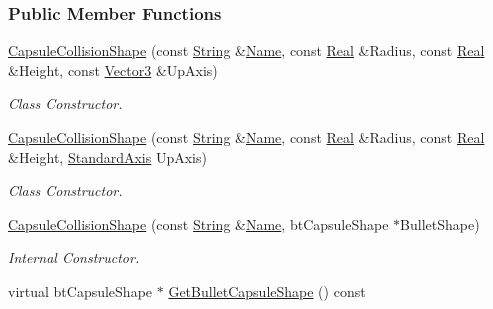 \subsubsection*{Public Member Functions}
\begin{DoxyCompactItemize}
\item 
\hyperlink{classMezzanine_1_1CapsuleCollisionShape_a8709e48065ef7698506c9854d41afe8e}{CapsuleCollisionShape} (const \hyperlink{namespaceMezzanine_acf9fcc130e6ebf08e3d8491aebcf1c86}{String} \&\hyperlink{classMezzanine_1_1CollisionShape_aac524c5c56fa4d158bc071f8aecfbe79}{Name}, const \hyperlink{namespaceMezzanine_a726731b1a7df72bf3583e4a97282c6f6}{Real} \&Radius, const \hyperlink{namespaceMezzanine_a726731b1a7df72bf3583e4a97282c6f6}{Real} \&Height, const \hyperlink{classMezzanine_1_1Vector3}{Vector3} \&UpAxis)
\begin{DoxyCompactList}\small\item\em Class Constructor. \item\end{DoxyCompactList}\item 
\hyperlink{classMezzanine_1_1CapsuleCollisionShape_abe6eb6dffc5f40d424974b4f0801cf28}{CapsuleCollisionShape} (const \hyperlink{namespaceMezzanine_acf9fcc130e6ebf08e3d8491aebcf1c86}{String} \&\hyperlink{classMezzanine_1_1CollisionShape_aac524c5c56fa4d158bc071f8aecfbe79}{Name}, const \hyperlink{namespaceMezzanine_a726731b1a7df72bf3583e4a97282c6f6}{Real} \&Radius, const \hyperlink{namespaceMezzanine_a726731b1a7df72bf3583e4a97282c6f6}{Real} \&Height, \hyperlink{namespaceMezzanine_ab41a00a8c6a47b576dc987ec34e16ba1}{StandardAxis} UpAxis)
\begin{DoxyCompactList}\small\item\em Class Constructor. \item\end{DoxyCompactList}\item 
\hyperlink{classMezzanine_1_1CapsuleCollisionShape_a5391a125678d98b509abc8f60cb475be}{CapsuleCollisionShape} (const \hyperlink{namespaceMezzanine_acf9fcc130e6ebf08e3d8491aebcf1c86}{String} \&\hyperlink{classMezzanine_1_1CollisionShape_aac524c5c56fa4d158bc071f8aecfbe79}{Name}, btCapsuleShape $\ast$BulletShape)
\begin{DoxyCompactList}\small\item\em Internal Constructor. \item\end{DoxyCompactList}\item 
virtual btCapsuleShape $\ast$ \hyperlink{classMezzanine_1_1CapsuleCollisionShape_ad9505b15fdcbd88231714992e5b3fc06}{GetBulletCapsuleShape} () const 

\end{DoxyCompactItemize}
